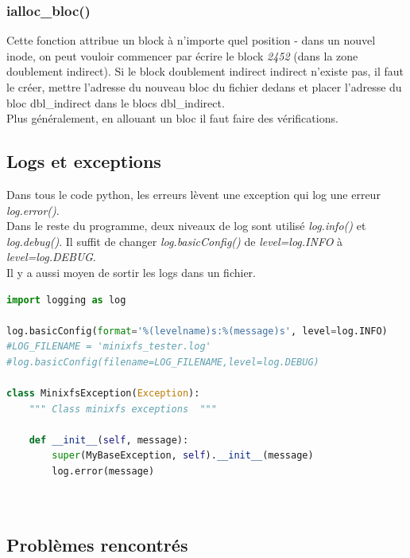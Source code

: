 \documentclass[a4paper,12pt]{article}
\begin{document}
\subsubsection*{ialloc\_bloc()}

Cette fonction attribue un block à n'importe quel position - dans un nouvel inode, on peut vouloir commencer par écrire le block \emph{2452} (dans la zone doublement indirect). Si le block doublement indirect indirect n'existe pas, il faut le créer, mettre l'adresse du nouveau bloc du fichier dedans et placer l'adresse du bloc dbl\_indirect dans le blocs dbl\_indirect.\\

Plus généralement, en allouant un bloc il faut faire des vérifications.\\


\subsection{Logs et exceptions}

Dans tous le code python, les erreurs lèvent une exception qui log une erreur \emph{log.error()}.\\

Dans le reste du programme, deux niveaux de log sont utilisé \emph{log.info()} et \emph{log.debug()}. Il suffit de changer \emph{log.basicConfig()} de \emph{level=log.INFO} à  \emph{level=log.DEBUG}.\\

Il y a aussi moyen de sortir les logs dans un fichier.\\


\begin{lstlisting}[language=python, caption=initialisation logs et exception MinixfsError()]
import logging as log

log.basicConfig(format='%(levelname)s:%(message)s', level=log.INFO)
#LOG_FILENAME = 'minixfs_tester.log'
#log.basicConfig(filename=LOG_FILENAME,level=log.DEBUG)

class MinixfsException(Exception):
    """ Class minixfs exceptions  """

    def __init__(self, message):
        super(MyBaseException, self).__init__(message)
        log.error(message)
        
        
\end{lstlisting}


\subsection{Problèmes rencontrés}
\end{document}
